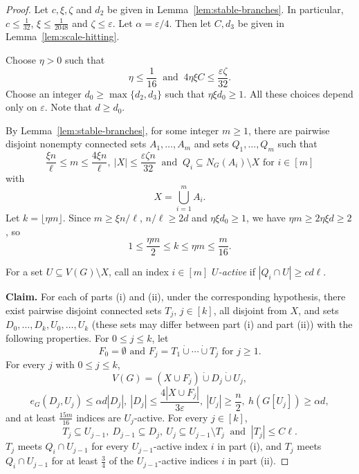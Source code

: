 \documentclass[10pt,a4paper]{amsart}
\newcommand{\eps}{\varepsilon}
\begin{document}
\begin{proof}
Let $c,\xi,\zeta$ and $d_2$ be given in
Lemma~\ref{lem:stable-branches}.  In particular, $c\le\frac{1}{32}$,
$\xi\le\frac{1}{2048}$ and $\zeta\le\eps$. Let $\alpha=\eps/4$.
Then let $C,d_3$ be given in  Lemma~\ref{lem:scale-hitting}.


Choose $\eta>0$ such that
\[
 \eta\le\frac{1}{16}
 \ \text{ and }\ 
 4\eta\xi C\le\frac{\eps\zeta}{32}.
\]
Choose  an integer $d_0\ge \max\{d_2, d_3\}$ such that  $\eta\xi d_0\ge1$. 
All these choices depend only on $\eps$. Note that $d\ge d_0$. 


By Lemma~\ref{lem:stable-branches}, for some integer $m\ge 1$, there are 
pairwise disjoint nonempty connected sets $A_1,\ldots,A_m$ and
sets $Q_1,\ldots,Q_m$ such that 
\[
 \frac{\xi n}{\ell}\le m\le\frac{4\xi n}{\ell},
 \ |X|\le\frac{\eps\zeta n}{32}
 \ \text{ and } \  Q_i\subseteq N_G(A_i)\setminus X
 \text{ for } i\in[m]
\]
with 
\[
 X=\bigcup_{i=1}^mA_i.
\]
Let $k=\lfloor\eta m\rfloor$. Since $m\ge\xi n/\ell$,
$n/\ell\ge2d$ and $\eta\xi d_0\ge1$, we have
$\eta m\ge2\eta\xi d\ge2$, so
\[
1\le\frac{\eta m}{2}\le k\le\eta m\le\frac m{16}.
\]

For a set $U\subseteq V(G)\setminus X$, call an index $i\in[m]$
\emph{$U$-active} if $|Q_i\cap U|\ge cd\ell$.




\medskip
\noindent\textbf{Claim.}
For each of parts (i) and (ii), under the
corresponding hypothesis, there exist pairwise disjoint connected sets
$T_j$, $j\in[k]$, all disjoint from $X$, and sets
$D_0,\ldots,D_k,U_0,\ldots,U_k$ (these sets
may differ between part (i) and part (ii)) with the following properties. 
For $0\le j\le k$, let
\[
 F_0=\emptyset
 \text{ and }
 F_j=T_1\mathbin{\dot\cup}\cdots\mathbin{\dot\cup}T_j
 \text{ for } j\ge 1.
\]
For every $j$ with $0\le j\le k$,
\begin{equation}\label{eq:scale-recursive-partition}
 V(G)=(X\cup F_j)\mathbin{\dot\cup}D_j
       \mathbin{\dot\cup}U_j,
\end{equation}
\[
 e_G(D_j,U_j)\le\alpha d|D_j|,
 \ 
 |D_j|\le\frac{4|X\cup F_j|}{3\eps},
 \ 
 |U_j|\ge\frac{n}{2}, \
 h(G[U_j])\ge\alpha d,
\]
and at least $\frac{15m}{16}$ indices are $U_j$-active.
For every $j\in [k]$,
\[
 T_j\subseteq U_{j-1},
 \ 
 D_{j-1}\subseteq D_j,
 \ 
 U_j\subseteq U_{j-1}\setminus T_j \
 \text{ and }\ 
 |T_j|\le C\ell.
\]
$T_j$ meets $Q_i\cap U_{j-1}$
for every $U_{j-1}$-active index $i$ in part (i), 
and 
$T_j$ meets $Q_i\cap U_{j-1}$ for at least $\frac34$ of
the $U_{j-1}$-active indices $i$ in part (ii).


\end{proof}
\end{document}
